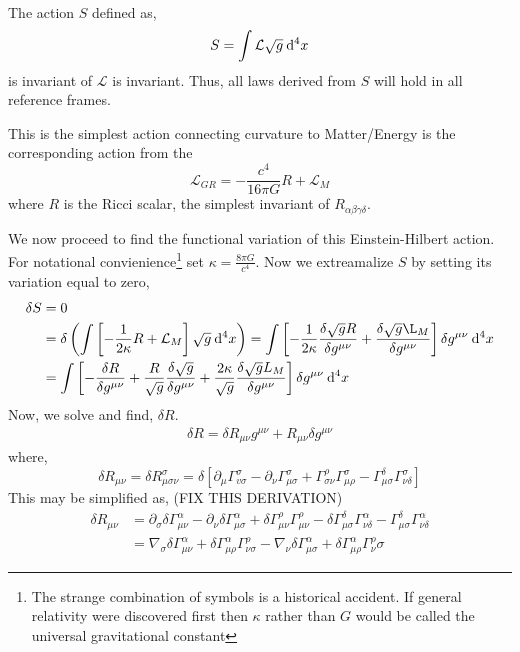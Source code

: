 \documentclass[11pt, a4paper]{article}
\begin{document}
\\
The action $S$ defined as, 
\[S = \int \mathcal{L}\sqrt{g} \: \mathrm{d}^{4} x \]
is invariant of $\mathcal{L}$ is invariant.  Thus, all laws derived from $S$ will hold in all reference frames.
\begin{definition}
This is the simplest action connecting curvature to Matter/Energy is the corresponding action from the
\[\mathcal{L}_{GR}  =-\frac{c^4}{16 \pi G} R + \mathcal{L}_M\]
where $R$ is the Ricci scalar, the simplest invariant of $R_{\alpha\beta\gamma\delta}$.  
\end{definition}
We now proceed to find the functional variation of this Einstein-Hilbert action. For notational convienience\footnote{The strange combination of symbols is a historical accident. If general relativity were discovered first then $\kappa$ rather than $G$ would be called the universal gravitational constant} set $\kappa = \frac{8\pi G}{c^4}$. Now we extreamalize $S$ by setting its variation equal to zero, 
\begin{align*}
\delta S & = 0
\\
& = \delta\left(\int \left[ -\frac{1}{2\kappa} R + \mathcal{L}_M\right]\sqrt{g} \: \dn{4}{x} \right)
= 
\int \left[-\frac{1}{2\kappa}\frac{\delta \sqrt{g} R}{\delta g^{\mu\nu}} +\frac{\delta\sqrt{g}\L_M}{\delta g^{\mu\nu}}\right] \delta g^{\mu\nu} \: \dn{4}{x}
\\
& = \int \left[ -\frac{\delta R}{\delta g^{\mu\nu}} + \frac{R}{\sqrt{g}}\frac{\delta\sqrt{g}}{\delta g^{\mu\nu}} + \frac{2\kappa}{\sqrt{g}} \frac{\delta\sqrt{g}L_M}{\delta g^{\mu\nu}}\right] \delta g^{\mu\nu} \: \dn{4}{x}
\end{align*}
Now, we solve and find, $\delta R$.  
\begin{align*}
    \delta R = \delta R_{\mu\nu} g^{\mu\nu}+ R_{\mu\nu} \delta g^{\mu\nu}
\end{align*}
where, 
\[\delta R_{\mu\nu} = \delta R^\sigma_{\mu\sigma \nu} = \delta\left[\partial_\mu \Gamma^\sigma _{v\sigma} -\partial_\nu \Gamma^\sigma_{\mu\sigma} + \Gamma^\rho_{\sigma \nu}\Gamma^\sigma_{\mu \rho} -\Gamma^\delta _{\mu\sigma} \Gamma^\sigma_{\nu \delta} \right] \]
This may be simplified as, 
(FIX THIS DERIVATION)
\begin{align*}
\delta R_{\mu\nu}& = \partial_\sigma \delta \Gamma^\alpha_{\mu\nu} - \partial_\nu \delta \Gamma^\alpha_{\mu\sigma} + \delta \Gamma^\rho_{\mu\nu} \Gamma^\rho_{\mu\nu} -\delta \Gamma^\delta _{\mu\sigma} \Gamma^\alpha_{\nu\delta} - \Gamma^\delta _{\mu\sigma} \Gamma^\alpha_{\nu\delta}
\\
& = \nabla_\sigma \delta\Gamma^\alpha_{\mu\nu} + \delta \Gamma^\alpha_{\mu\rho} \Gamma^\rho_{\nu\sigma} - \nabla_\nu \delta\Gamma^\alpha_{\mu\sigma} + \delta \Gamma^\alpha_{\mu\rho} \Gamma^\rho _\nu\sigma
\end{align*}
\end{document}
